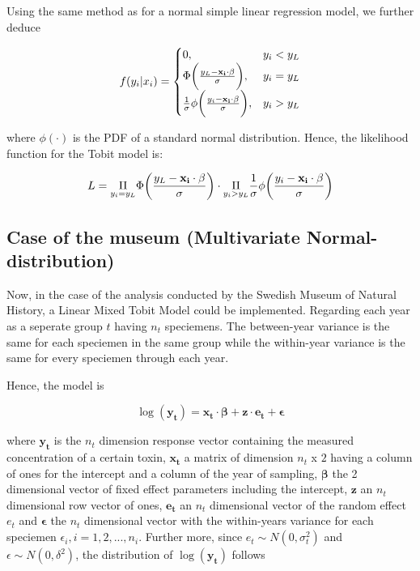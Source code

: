 \documentclass[]{article}
\begin{document}
Using the same method as for a normal simple linear regression model, we
further deduce

\[
f(y_i|x_i)= \begin{cases}
0, & y_i<y_L \\
\Phi\bigg{(}\frac{y_L-\mathbf{x_i}\cdot\mathbf{\beta}}{\sigma}\bigg{)}, & y_i=y_L \\
\frac{1}{\sigma}\phi\bigg{(}\frac{y_i-\mathbf{x_i} \cdot \mathbf{\beta}}{\sigma}\bigg{)}, & y_i>y_L
\end{cases}
\]

where \(\phi(\cdot)\) is the PDF of a standard normal distribution.
Hence, the likelihood function for the Tobit model is:

\[
L = \underset{y_i=y_L}{\Pi} \Phi\bigg{(}\frac{y_L-\mathbf{x_i}\cdot\mathbf{\beta}}{\sigma}\bigg{)} \cdot \underset{y_i>y_L}{\Pi}\frac{1}{\sigma}\phi\bigg{(}\frac{y_i-\mathbf{x_i}\cdot\mathbf{\beta}}{\sigma}\bigg{)}
\]

\hypertarget{case-of-the-museum-multivariate-normal-distribution}{%
\subsection{Case of the museum (Multivariate
Normal-distribution)}\label{case-of-the-museum-multivariate-normal-distribution}}

Now, in the case of the analysis conducted by the Swedish Museum of
Natural History, a Linear Mixed Tobit Model could be implemented.
Regarding each year as a seperate group \(t\) having \(n_t\) speciemens.
The between-year variance is the same for each speciemen in the same
group while the within-year variance is the same for every speciemen
through each year.

Hence, the model is

\[
\log(\mathbf{y_t}) = \mathbf{x_t} \cdot \mathbf{\beta} + \mathbf{z} \cdot \mathbf{e_t} + \mathbf{\epsilon}
\]

where \(\mathbf{y_t}\) is the \(n_t\) dimension response vector
containing the measured concentration of a certain toxin,
\(\mathbf{x_t}\) a matrix of dimension \(n_t\) x \(2\) having a column
of ones for the intercept and a column of the year of sampling,
\(\mathbf{\beta}\) the 2 dimensional vector of fixed effect parameters
including the intercept, \(\mathbf{z}\) an \(n_t\) dimensional row
vector of ones, \(\mathbf{e_t}\) an \(n_t\) dimensional vector of the
random effect \(e_t\) and \(\mathbf{\epsilon}\) the \(n_t\) dimensional
vector with the within-years variance for each speciemen
\(\epsilon_i, i=1,2,...,n_i\). Further more, since
\(e_t \sim N(0,\sigma_t^2)\) and \(\epsilon \sim N(0,\delta^2)\), the
distribution of \(\log(\mathbf{y_t})\) follows
\end{document}
